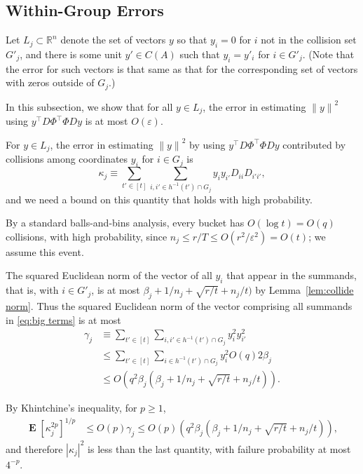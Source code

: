 \documentclass{sig-alternate}
\newcommand{\norm}[1]{{\| #1 \|}}
\DeclareMathOperator{\E}{\mathbf{E}}
\newcommand{\eps}{\varepsilon}
\newcommand{\R}{{\mathbb R}}
\begin{document}
\subsection{Within-Group Errors}

Let $L_j\subset \R^n$ denote the set of vectors $y$ so that $y_i=0$
for $i$ not in the collision set $G'_j$,
and there is some unit $y'\in C(A)$ such that $y_i = y'_i$
for $i\in G'_j$. (Note that the error for such vectors is that
same as that for the corresponding set of vectors 
with zeros outside of $G_j$.)

In this subsection, we show that for all $y\in L_j$,
the error in estimating $\norm{y}^2$ using $y^\top D\Phi^\top \Phi D y$
is at most $O(\eps)$. 

For $y\in L_j$, the error in estimating
$\norm{y}^2$ by using $y^\top D\Phi^\top \Phi D y$ contributed
by collisions among coordinates $y_i$ for $i\in G_j$ is
\begin{equation}\label{eq:big terms}
\kappa_j \equiv \sum_{t'\in [t]} \sum_{i,i'\in h^{-1}(t')\cap G_j} y_i y_{i'} D_{ii} D_{i'i'},
\end{equation}
and we need a bound on this quantity that holds with high probability.



By a standard balls-and-bins analysis, every bucket has $O(\log t)=O(q)$
collisions, with high probability,
since $n_j \le r/T \le O(r^2/\eps^2) = O(t)$; we assume this event.

The squared Euclidean norm of the vector
of all $y_i$ that appear in the summands, that is, with $i\in G'_j$, is
at most $\beta_j + 1/n_j + \sqrt{r/t}+ n_j/t)$ by Lemma~\ref{lem:collide norm}.
Thus the squared Euclidean norm
of the vector comprising all summands in \eqref{eq:big terms}
is at most
\begin{align}
\gamma_j
	  & \equiv \sum_{t'\in [t]} \sum_{i,i'\in h^{-1}(t')\cap G_j} y_i^2 y_{i'}^2
	\\ & \le \sum_{t'\in [t]} \sum_{i\in h^{-1}(t')\cap G_j} y_i^2 O(q) 2 \beta_j\nonumber
	\\ & \le O(q^2\beta_j (\beta_j + 1/n_j + \sqrt{r/t}+ n_j/t)).\label{eq:collision norm}
\end{align}

By Khintchine's inequality, for $p\ge 1$,
\begin{align*}
\E[\kappa_j^{2p}]^{1/p}
	  & \le O(p) \gamma_j \le O(p) (q^2\beta_j (\beta_j + 1/n_j + \sqrt{r/t}+ n_j/t)),
\end{align*}
and therefore $|\kappa_j|^2$ is less than the last quantity, with failure probability
at most $4^{-p}$.
\end{document}
